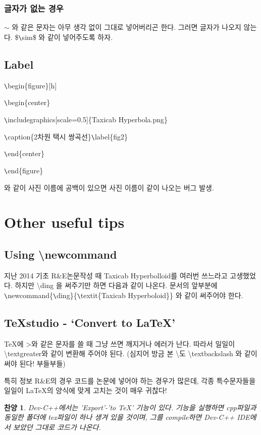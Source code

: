 \documentclass[11pt]{article}
\newtheorem{praise}{찬양}
\begin{document}
\subsubsection{글자가 없는 경우}
$\sim$ 와 같은 문자는 아무 생각 없이 그대로 넣어버리곤 한다. 그러면 글자가 나오지 않는다. 
\$\verb+\+sim\$ 와 같이 넣어주도록 하자.


\subsection{Label}
\verb+\+begin\{figure\}[h]

\verb+\+begin\{center\}

\verb+\+includegraphics[scale=0.5]\{Taxicab Hyperbola.png\} 

\verb+\+caption\{2차원 택시 쌍곡선\}\verb+\+label\{fig2\}

\verb+\+end\{center\}

\verb+\+end\{figure\}

와 같이 사진 이름에 공백이 있으면 사진 이름이 같이 나오는 버그 발생.

\section{Other useful tips}
\subsection{Using \textbackslash newcommand}
지난 2014 기초 R\&E논문작성 때 Taxicab Hyperbolloid를 여러번 쓰느라고 고생했었다.
하지만 \textbackslash ding 을 써주기만 하면 다음과 같이 나온다. 
문서의 앞부분에 \verb+\+newcommand\{\verb+\+ding\}\{\verb+\+textit\{Taxicab Hyperboloid\}\} 와 같이 써주어야 한다. 
\ding

\subsection{TeXstudio - \textquoteleft Convert to LaTeX\textquoteright}
TeX에 \textgreater 와 같은 문자를 쓸 때 그냥 쓰면 깨지거나 에러가 난다. 따라서 일일이 \textbackslash textgreater와 같이 변환해 주어야 된다. (심지어 방금 본 \textbackslash 도 \textbackslash textbackslash 와 같이 써야 된다! 부들부들)

특히 정보 R\&E의 경우 코드를 논문에 넣어야 하는 경우가 많은데, 각종 특수문자들을 일일이 LaTeX의 양식에 맞게 고치는 것이 매우 귀찮다!

\begin{praise}
	Dev-C++에서는 'Export'-'to TeX' 기능이 있다. 기능을 실행하면 cpp파일과 동일한 폴더에 tex파일이 하나 생겨 있을 것이며, 그를 compile하면 Dev-C++ IDE에서 보았던 그대로 코드가 나온다.\label{Dev-C++}
\end{praise} 
\end{document}
